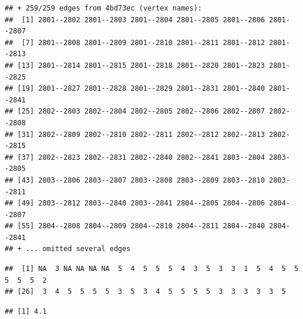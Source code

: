 \documentclass[
]{book}
\newenvironment{Shaded}{\begin{snugshade}}{\end{snugshade}}
\newcommand{\AttributeTok}[1]{\textcolor[rgb]{0.77,0.63,0.00}{#1}}
\newcommand{\CommentTok}[1]{\textcolor[rgb]{0.56,0.35,0.01}{\textit{#1}}}
\newcommand{\ConstantTok}[1]{\textcolor[rgb]{0.00,0.00,0.00}{#1}}
\newcommand{\FunctionTok}[1]{\textcolor[rgb]{0.00,0.00,0.00}{#1}}
\newcommand{\NormalTok}[1]{#1}
\newcommand{\SpecialCharTok}[1]{\textcolor[rgb]{0.00,0.00,0.00}{#1}}
\begin{document}
\begin{verbatim}
## + 259/259 edges from 4bd73ec (vertex names):
##  [1] 2801--2802 2801--2803 2801--2804 2801--2805 2801--2806 2801--2807
##  [7] 2801--2808 2801--2809 2801--2810 2801--2811 2801--2812 2801--2813
## [13] 2801--2814 2801--2815 2801--2818 2801--2820 2801--2823 2801--2825
## [19] 2801--2827 2801--2828 2801--2829 2801--2831 2801--2840 2801--2841
## [25] 2802--2803 2802--2804 2802--2805 2802--2806 2802--2807 2802--2808
## [31] 2802--2809 2802--2810 2802--2811 2802--2812 2802--2813 2802--2815
## [37] 2802--2823 2802--2831 2802--2840 2802--2841 2803--2804 2803--2805
## [43] 2803--2806 2803--2807 2803--2808 2803--2809 2803--2810 2803--2811
## [49] 2803--2812 2803--2840 2803--2841 2804--2805 2804--2806 2804--2807
## [55] 2804--2808 2804--2809 2804--2810 2804--2811 2804--2840 2804--2841
## + ... omitted several edges
\end{verbatim}

\begin{Shaded}
\end{Shaded}

\begin{verbatim}
##  [1] NA  3 NA NA NA NA  5  4  5  5  5  4  3  5  3  3  1  5  4  5  5  5  5  5  2
## [26]  3  4  5  5  5  5  3  5  3  4  5  5  5  5  3  3  3  3  3  5
\end{verbatim}

\begin{Shaded}
\end{Shaded}

\begin{verbatim}
## [1] 4.1
\end{verbatim}

\begin{Shaded}
\end{Shaded}
\end{document}
